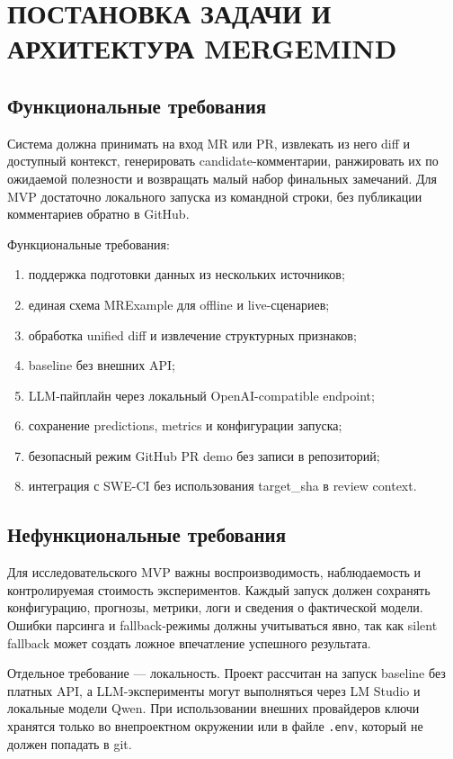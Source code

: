 \documentclass[14pt,a4paper]{extreport}
\begin{document}
\chapter{ПОСТАНОВКА ЗАДАЧИ И АРХИТЕКТУРА MERGEMIND}

\section{Функциональные требования}

Система должна принимать на вход MR или PR, извлекать из него diff и
доступный контекст, генерировать candidate-комментарии, ранжировать их по
ожидаемой полезности и возвращать малый набор финальных замечаний. Для MVP
достаточно локального запуска из командной строки, без публикации комментариев
обратно в GitHub.

Функциональные требования:

\begin{enumerate}
  \item поддержка подготовки данных из нескольких источников;
  \item единая схема MRExample для offline и live-сценариев;
  \item обработка unified diff и извлечение структурных признаков;
  \item baseline без внешних API;
  \item LLM-пайплайн через локальный OpenAI-compatible endpoint;
  \item сохранение predictions, metrics и конфигурации запуска;
  \item безопасный режим GitHub PR demo без записи в репозиторий;
  \item интеграция с SWE-CI без использования target\_sha в review context.
\end{enumerate}

\section{Нефункциональные требования}

Для исследовательского MVP важны воспроизводимость, наблюдаемость и
контролируемая стоимость экспериментов. Каждый запуск должен сохранять
конфигурацию, прогнозы, метрики, логи и сведения о фактической модели.
Ошибки парсинга и fallback-режимы должны учитываться явно, так как silent
fallback может создать ложное впечатление успешного результата.

Отдельное требование --- локальность. Проект рассчитан на запуск baseline без
платных API, а LLM-эксперименты могут выполняться через LM Studio и локальные
модели Qwen. При использовании внешних провайдеров ключи хранятся только во
внепроектном окружении или в файле \texttt{.env}, который не должен попадать в
git.
\end{document}
